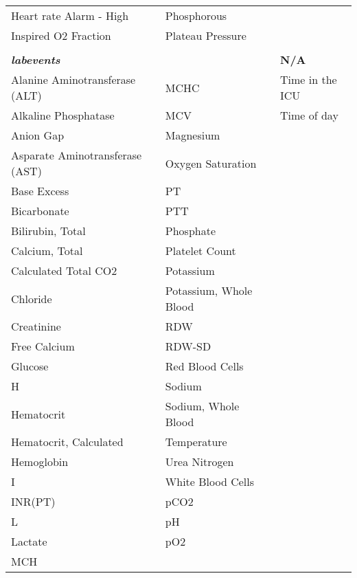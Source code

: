 \documentclass[sigconf]{acmart}
\begin{document}
\begin{table*}[h]
\begin{tabular}{lll}
        Heart rate Alarm - High & Phosphorous &  \\
        Inspired O2 Fraction & Plateau Pressure &  \\
        \vspace{-0.8em}\\
        \toprule
        \multicolumn{2}{l}{\textbf{\textit{labevents}}} & \textbf{N/A} \\
        \midrule
        Alanine Aminotransferase (ALT) & MCHC & Time in the ICU \\
        Alkaline Phosphatase & MCV & Time of day \\
        Anion Gap & Magnesium & \\
        Asparate Aminotransferase (AST) & Oxygen Saturation & \\
        Base Excess & PT & \\
        Bicarbonate & PTT & \\
        Bilirubin, Total & Phosphate &  \\
        Calcium, Total & Platelet Count & \\
        Calculated Total CO2 & Potassium & \\
        Chloride & Potassium, Whole Blood & \\
        Creatinine & RDW & \\
        Free Calcium & RDW-SD & \\
        Glucose & Red Blood Cells & \\
        H & Sodium & \\
        Hematocrit & Sodium, Whole Blood & \\
        Hematocrit, Calculated & Temperature & \\
        Hemoglobin & Urea Nitrogen & \\
        I & White Blood Cells & \\
        INR(PT) & pCO2 & \\
        L & pH & \\
        Lactate & pO2 & \\
        MCH & & \\
        \bottomrule
    \end{tabular}
\end{table*} 
\end{document}
